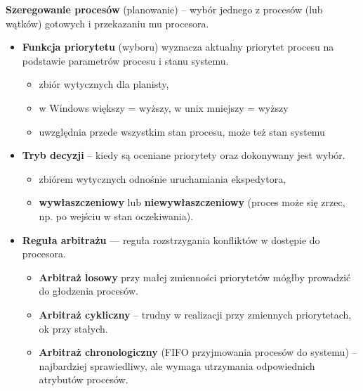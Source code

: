 \documentclass[main.tex]{subfiles}
\begin{document}
    \noindent \textbf{Szeregowanie procesów} (planowanie) -- wybór jednego z procesów (lub wątków) gotowych i
    przekazaniu mu procesora.
    \begin{itemize}[noitemsep]
        \item \textbf{Funkcja priorytetu} (wyboru) wyznacza aktualny priorytet procesu na podstawie parametrów procesu i stanu
        systemu.
        \begin{itemize}[noitemsep]
            \item zbiór wytycznych dla planisty,
            \item w Windows większy = wyższy, w unix mniejszy = wyższy
            \item uwzględnia przede wszystkim stan procesu, może też stan systemu
        \end{itemize}

        \item \textbf{Tryb decyzji} -- kiedy są oceniane priorytety oraz dokonywany jest wybór.
        \begin{itemize}[noitemsep]
            \item zbiórem wytycznych odnośnie uruchamiania ekspedytora,
            \item \textbf{wywłaszczeniowy} lub \textbf{niewywłaszczeniowy} (proces może się zrzec, np. po wejściu w stan oczekiwania).
        \end{itemize}

        \item \textbf{Reguła arbitrażu} — reguła rozstrzygania konfliktów w dostępie do procesora.
        \begin{itemize}[noitemsep]
            \item \textbf{Arbitraż losowy} przy małej zmienności priorytetów mógłby prowadzić do głodzenia procesów.
            \item \textbf{Arbitraż cykliczny} -- trudny w realizacji przy zmiennych priorytetach, ok przy stałych.
            \item \textbf{Arbitraż chronologiczny} (FIFO przyjmowania procesów do systemu) -- najbardziej sprawiedliwy, ale wymaga utrzymania odpowiednich
            atrybutów procesów.
        \end{itemize}
    \end{itemize}
\end{document}
